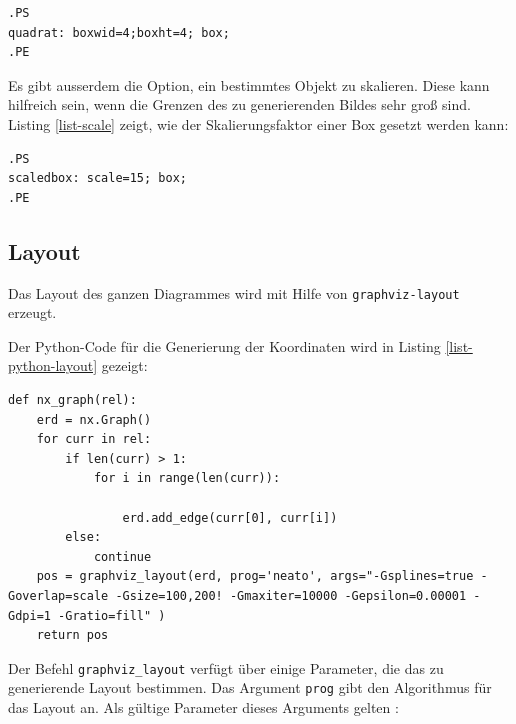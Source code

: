 \lstset{frame=lines}
\lstset{basicstyle=\footnotesize}
\begin{lstlisting}
.PS
quadrat: boxwid=4;boxht=4; box;
.PE
\end{lstlisting}

\noindent
Es gibt ausserdem die Option, ein bestimmtes Objekt zu skalieren. Diese kann hilfreich sein, wenn die Grenzen des zu generierenden Bildes sehr groß sind. Listing \ref{list-scale} zeigt, wie der Skalierungsfaktor einer Box gesetzt werden kann:

\lstset{frame=lines}
\lstset{basicstyle=\footnotesize}
\begin{lstlisting}
.PS
scaledbox: scale=15; box;
.PE
\end{lstlisting}

\subsection{Layout}
\label{layout}
\pra
\noindent
Das Layout des ganzen Diagrammes wird mit Hilfe von \verb|graphviz-layout| erzeugt. 

\noindent
Der Python-Code für die Generierung der Koordinaten wird in Listing \ref{list-python-layout} gezeigt:
\\
\lstset{language=Python}
\lstset{frame=lines}
\lstset{basicstyle=\footnotesize}
\begin{lstlisting}
def nx_graph(rel):
    erd = nx.Graph()
    for curr in rel:
        if len(curr) > 1:
            for i in range(len(curr)):

                erd.add_edge(curr[0], curr[i])
        else:
            continue
    pos = graphviz_layout(erd, prog='neato', args="-Gsplines=true -Goverlap=scale -Gsize=100,200! -Gmaxiter=10000 -Gepsilon=0.00001 -Gdpi=1 -Gratio=fill" )
    return pos
\end{lstlisting}

\noindent
Der Befehl \verb|graphviz_layout| verfügt über einige Parameter, die das zu generierende Layout bestimmen. Das Argument \verb|prog| gibt den Algorithmus für das Layout an. Als gültige Parameter dieses Arguments gelten : 
\\

